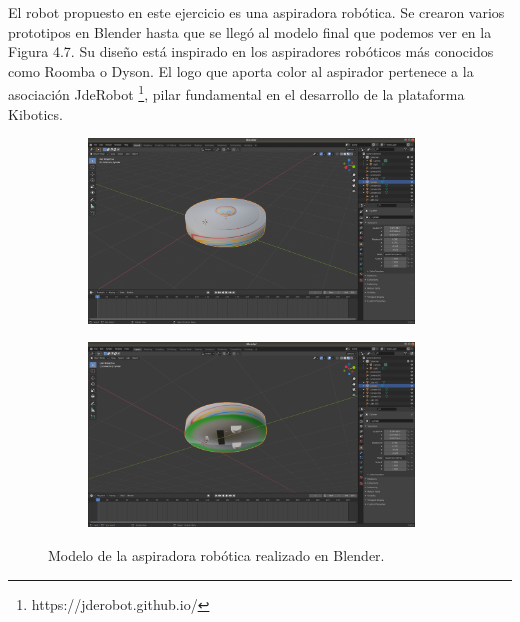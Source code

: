 El robot  propuesto en este ejercicio es una aspiradora robótica. Se crearon varios prototipos en Blender  hasta que se llegó al modelo final que podemos ver en la Figura 4.7. Su diseño está inspirado en los aspiradores robóticos más conocidos como Roomba o Dyson. El logo que aporta color al aspirador pertenece a la asociación JdeRobot \footnote{https://jderobot.github.io/}, pilar fundamental en el desarrollo de la plataforma Kibotics.
 
 \begin{figure}[H]
  \begin{subfigure}[b]{0.5\textwidth}
  \centering
    \includegraphics[width=0.95\textwidth, height=0.7\textwidth]{chapters/images/roombablender.png}
    \caption{}
    \label{fig:f1}
  \end{subfigure}
  \hfill
  \begin{subfigure}[b]{0.5\textwidth}
  \centering
    \includegraphics[width=0.95\textwidth, height=0.7\textwidth]{chapters/images/roombablender2.png}
	\caption{}    
    \label{fig:f2}
 
  \end{subfigure}
  \caption{Modelo de la aspiradora robótica  realizado en Blender.}
\end{figure}

